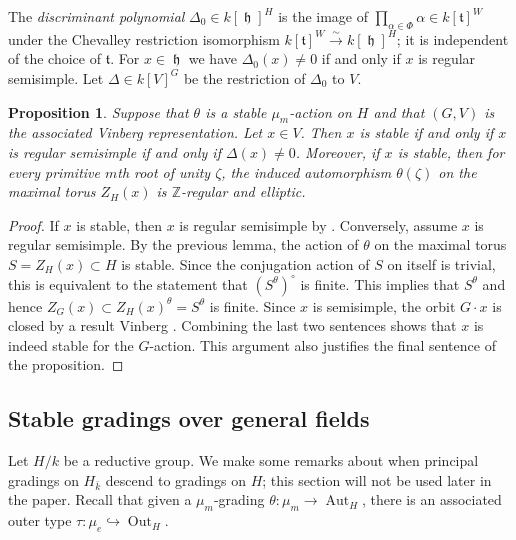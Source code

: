 \documentclass{article} %
\newtheorem{proposition}{Proposition}[section]
\numberwithin{equation}{section}
\theoremstyle{definition}
\DeclareMathOperator{\lieh}{\mathfrak{h}}
\DeclareMathOperator{\Aut}{Aut}
\DeclareMathOperator{\Out}{Out}
\newcommand{\Z}{\mathbb{Z}}
\newcommand{\al}{\alpha}
\begin{document}
The \emph{discriminant polynomial} $\Delta_0 \in k[\lieh]^H$ is the image of $\prod_{\al \in \Phi} \alpha \in k[\mathfrak{t}]^W$ under the Chevalley restriction isomorphism $k[\mathfrak{t}]^W \xrightarrow{\sim} k[\lieh]^H$; it is independent of the choice of $\mathfrak{t}$.
For $x\in \lieh$ we have $\Delta_0(x) \neq 0$ if and only if $x$ is regular semisimple.
Let $\Delta\in k[V]^G$ be the restriction of $\Delta_0$ to $V$.



\begin{proposition}\label{proposition: regular semisimple iff stable}
    Suppose that $\theta$ is a stable $\mu_m$-action on $H$ and that $(G,V)$ is the associated Vinberg representation.
    Let $x\in V$.
    Then $x$ is stable if and only if $x$ is regular semisimple if and only if $\Delta(x) \neq 0$.
    Moreover, if $x$ is stable, then for every primitive $m$th root of unity $\zeta$, the induced automorphism $\theta(\zeta)$ on the maximal torus $Z_H(x)$ is $\Z$-regular and elliptic.
\end{proposition}
\begin{proof}
    If $x$ is stable, then $x$ is regular semisimple by \cite[Lemma 13]{GrossLevyReederYu-GradingsPosRank}. 
    Conversely, assume $x$ is regular semisimple. 
    By the previous lemma, the action of $\theta$ on the maximal torus $S = Z_H(x) \subset H$ is stable. 
    Since the conjugation action of $S$ on itself is trivial, this is equivalent to the statement that $(S^{\theta})^{\circ}$ is finite.
    This implies that $S^{\theta}$ and hence $Z_G(x) \subset Z_H(x)^{\theta} = S^{\theta}$ is finite. Since $x$ is semisimple, the orbit $G\cdot x$ is closed by a result Vinberg \cite[Prop. 3]{Vinberg-theweylgroupofgraded}.
    Combining the last two sentences shows that $x$ is indeed stable for the $G$-action.
    This argument also justifies the final sentence of the proposition.
\end{proof}



\subsection{Stable gradings over general fields}\label{subsec: stable gradings over general fields}

Let $H/k$ be a reductive group.
We make some remarks about when principal gradings on $H_{\bar{k}}$ descend to gradings on $H$; this section will not be used later in the paper.
Recall that given a $\mu_m$-grading $\theta\colon \mu_m \rightarrow \Aut_H$, there is an associated outer type $\tau\colon \mu_e\hookrightarrow \Out_H$.
\end{document}
